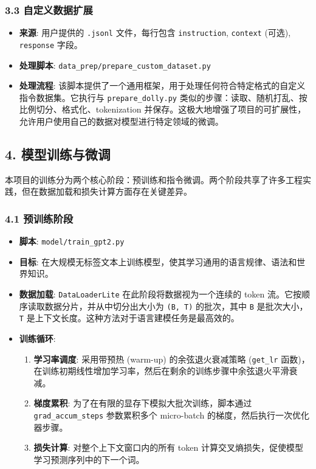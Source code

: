 \documentclass[a4paper]{article}
\providecommand{\tightlist}{%
  \setlength{\itemsep}{0pt}\setlength{\parskip}{0pt}}
\begin{document}
\subsubsection{3.3
自定义数据扩展}\label{ux81eaux5b9aux4e49ux6570ux636eux6269ux5c55}

\begin{itemize}
\tightlist
\item
  \textbf{来源}: 用户提供的 \texttt{.jsonl} 文件，每行包含
  \texttt{instruction}, \texttt{context} (可选), \texttt{response}
  字段。
\item
  \textbf{处理脚本}: \texttt{data\_prep/prepare\_custom\_dataset.py}
\item
  \textbf{处理流程}:
  该脚本提供了一个通用框架，用于处理任何符合特定格式的自定义指令数据集。它执行与
  \texttt{prepare\_dolly.py}
  类似的步骤：读取、随机打乱、按比例切分、格式化、tokenization
  并保存。这极大地增强了项目的可扩展性，允许用户使用自己的数据对模型进行特定领域的微调。
\end{itemize}

\subsection{4.
模型训练与微调}\label{ux6a21ux578bux8badux7ec3ux4e0eux5faeux8c03}

本项目的训练分为两个核心阶段：预训练和指令微调。两个阶段共享了许多工程实践，但在数据加载和损失计算方面存在关键差异。

\subsubsection{4.1 预训练阶段}\label{ux9884ux8badux7ec3ux9636ux6bb5}

\begin{itemize}
\tightlist
\item
  \textbf{脚本}: \texttt{model/train\_gpt2.py}
\item
  \textbf{目标}:
  在大规模无标签文本上训练模型，使其学习通用的语言规律、语法和世界知识。
\item
  \textbf{数据加载}: \texttt{DataLoaderLite}
  在此阶段将数据视为一个连续的 token
  流。它按顺序读取数据分片，并从中切分出大小为 \texttt{(B,\ T)}
  的批次，其中 \texttt{B} 是批次大小，\texttt{T}
  是上下文长度。这种方法对于语言建模任务是最高效的。
\item
  \textbf{训练循环}:

  \begin{enumerate}
  \def\labelenumi{\arabic{enumi}.}
  \tightlist
  \item
    \textbf{学习率调度}: 采用带预热 (warm-up) 的余弦退火衰减策略
    (\texttt{get\_lr}
    函数)，在训练初期线性增加学习率，然后在剩余的训练步骤中余弦退火平滑衰减。
  \item
    \textbf{梯度累积}: 为了在有限的显存下模拟大批次训练，脚本通过
    \texttt{grad\_accum\_steps} 参数累积多个 micro-batch
    的梯度，然后执行一次优化器步骤。
  \item
    \textbf{损失计算}: 对整个上下文窗口内的所有 token
    计算交叉熵损失，促使模型学习预测序列中的下一个词。
  \end{enumerate}
\end{itemize}
\end{document}
